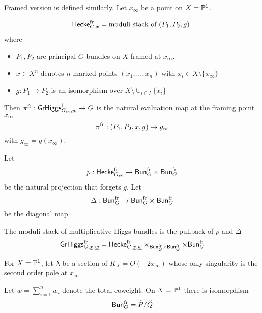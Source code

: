 \documentclass[12pt,psamsfonts,reqno]{amsart}
\begin{document}
Framed version is defined similarly. Let $x_{\infty}$ be a point on $X = \mathbb P^{1}$. 
\begin{definition}
\begin{equation}
  \mathsf{Hecke}^{\mathrm{fr}}_{G, \underline{x}} = \text{moduli stack of  $(P_1, P_2 , g)$ }
\end{equation}
where

\begin{itemize}
\item  $P_1, P_2$ are principal $G$-bundles on $X$ framed at $x_\infty$.
\item $\underline{x} \in X^n$ denotes $n$ marked points $(x_1, \dots, x_n)$ with $x_i \in X \setminus \{x_\infty\}$
\item $g: P_{1} \to P_{2}$ is an isomorphism over $X \setminus \cup_{i \in I} \{ x_i \}$ 
\end{itemize}
\end{definition}
Then  $\pi^{\mathrm{fr}}: \mathsf{GrHiggs}_{G,\underline{x}, \underline{w}}^{\mathrm{fr}} \to G$ is the
 natural evaluation map at the framing point $x_\infty$
  \begin{equation}
\label{eq:pifr}
    \pi^{\mathrm{fr}}: (P_1, P_2, \underline{x}, g) \mapsto g_\infty
  \end{equation}
 with $g_\infty = g(x_\infty)$.
  
Let
\begin{equation}
  p:  \mathsf{Hecke}^{\mathrm{fr}}_{G, \underline{x}}  \to \mathsf{Bun}_{G}^{\mathrm{fr}} \times \mathsf{Bun}_{G}^{\mathrm{fr}} 
\end{equation}
be the natural projection that forgets $g$.
Let
\begin{equation}
  \Delta: \mathsf{Bun}_{G}^{\mathrm{fr}}  \to \mathsf{Bun}_{G}^{\mathrm{fr}}  \times \mathsf{Bun}_{G}^{\mathrm{fr}}
\end{equation}
be the diagonal map

\begin{definition} The moduli stack of multiplicative Higgs bundles is
  the pullback of $p$ and $\Delta$
  \begin{equation}
  \mathsf{GrHiggs}_{G,\underline{x}, \underline{w}}^{\mathrm{fr}} = \mathsf{Hecke}^{\mathrm{fr}}_{G, \underline{x},\underline{w}} \times_{\mathsf{Bun}_{G}^{\mathrm{fr}}  \times \mathsf{Bun}_{G}^{\mathrm{fr}}} \times \mathsf{Bun}_{G}^{\mathrm{fr}}
  \end{equation}
\end{definition}

For $X  = \mathbb P^1$, let $\lambda$ be a section of $K_X  = O(-2 x_\infty)$ whose only
singularity is the second order pole at $x_\infty$.

Let $w = \sum_{i=1}^{n} w_i$ denote the total coweight.  On  $X = \mathbb P^1$ there is isomorphism 
  \begin{equation}
\mathsf{Bun}_{G}^{\mathrm{fr}} = \check P / \check Q
  \end{equation}
\end{document}
